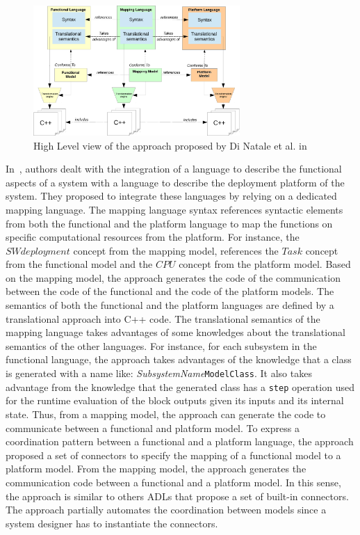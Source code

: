 \begin{figure}[ht!]
	\begin{center}
		\includegraphics[width=0.7\textwidth]{background/figs/diNatale}
		\caption{High Level view of the approach proposed by Di Natale et al. in~\cite{dinatale}}
		\label{fig:diNatale}
	\end{center}
\end{figure}

In~\cite{dinatale}, authors dealt with the integration of a language to describe the functional aspects of a system with a language to describe the deployment platform of the system. They proposed to integrate these languages by relying on a dedicated mapping language. The mapping language syntax references syntactic elements from both the functional and the platform language to map the functions on specific computational resources from the platform. For instance, the $SWdeployment$ concept from the mapping model, references the $Task$ concept from the functional model and the $CPU$ concept from the platform model. Based on the mapping model, the approach generates the code of the communication between the code of the functional and the code of the platform models. The semantics of both the functional and the platform languages are defined by a translational approach into C++ code. The translational semantics of the mapping language takes advantages of some knowledges about the translational semantics of the other languages. For instance, for each subsystem in the functional language, the approach takes advantages of the knowledge that a class is generated with a name like: \emph{SubsystemName}\texttt{ModelClass}. It also takes advantage from the knowledge that the generated class has a \texttt{step} operation used for the runtime evaluation of the block outputs given its inputs and its internal state. Thus, from a mapping model, the approach can generate the code to communicate between a functional and platform model. To express a coordination pattern between a functional and a platform language, the approach proposed a set of connectors to specify the mapping of a functional model to a platform model. From the mapping model, the approach generates the communication code between a functional and a platform model. In this sense, the approach is similar to others ADLs that propose a set of built-in connectors. The approach partially automates the coordination between models since a system designer has to instantiate the connectors.  


